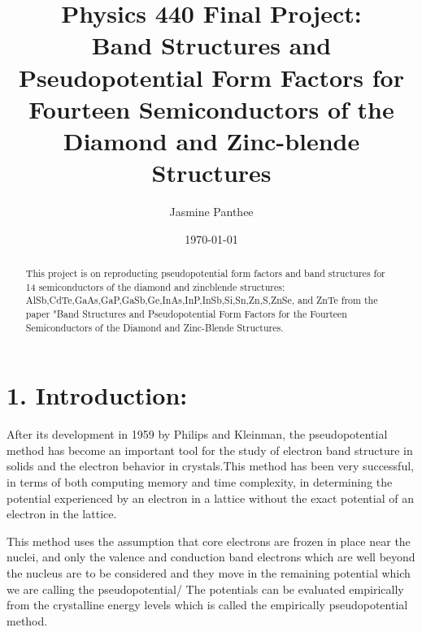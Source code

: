 \documentclass[%
 reprint,
 amsmath,amssymb,
 aps,
]{revtex4-2}
\begin{document}

\title{Physics 440 Final Project:\\Band Structures and Pseudopotential Form Factors for Fourteen Semiconductors of the Diamond and Zinc-blende Structures }%


\author{Jasmine Panthee}



\date{\today}%

\begin{abstract}
This project is on reproducting pseudopotential form factors and band structures for 14 semiconductors of the diamond and zincblende structures: AlSb,CdTe,GaAs,GaP,GaSb,Ge,InAs,InP,InSb,Si,Sn,Zn,S,ZnSe, and ZnTe from the paper "Band Structures and Pseudopotential Form Factors for the Fourteen Semiconductors of the Diamond and Zinc-Blende Structures. 
\end{abstract}

\maketitle


\section{\label{sec:level1}1. Introduction: }

After its development in 1959 by Philips and Kleinman, the pseudopotential method has become an important tool for the study of electron band structure in solids and the electron behavior in crystals.This method has been very successful, in terms of both computing memory and time complexity, in determining the potential experienced by an electron in a lattice without the exact potential of an electron in the lattice.   

This method uses the assumption that core electrons are frozen in place near the nuclei, and only the valence and conduction band electrons which are well beyond the nucleus are to be considered and they move in the remaining potential which we are calling the pseudopotential/ The potentials can be evaluated empirically from the crystalline energy levels which is called the empirically pseudopotential method.
\end{document}
